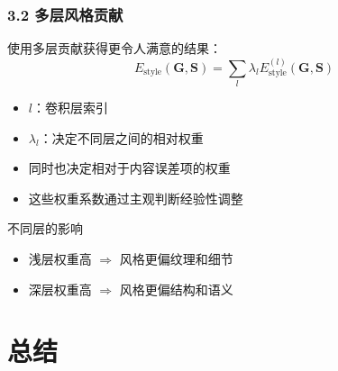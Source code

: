 \documentclass[t,aspectratio=169]{beamer} %
\begin{document}
\begin{frame}
    \frametitle{3.2 多层风格贡献}
    使用\alert{多层}贡献获得更令人满意的结果：
    \begin{equation}
        E_{\text{style}}(\mathbf{G}, \mathbf{S}) = \sum_{l} \lambda_l E_{\text{style}}^{(l)}(\mathbf{G}, \mathbf{S})
        \tag{10.17}
    \end{equation}
    \begin{itemize}
        \item $l$：卷积层索引
        \item $\lambda_l$：决定不同层之间的\alert{相对权重}
        \item 同时也决定相对于\alert{内容误差项}的权重
        \item 这些权重系数通过\alert{主观判断经验性调整}
    \end{itemize}
    \begin{block}{不同层的影响}
        \begin{itemize}
            \item 浅层权重高 $\Rightarrow$ 风格更偏纹理和细节
            \item 深层权重高 $\Rightarrow$ 风格更偏结构和语义
        \end{itemize}
    \end{block}
\end{frame}

\section{总结}
\end{document}
